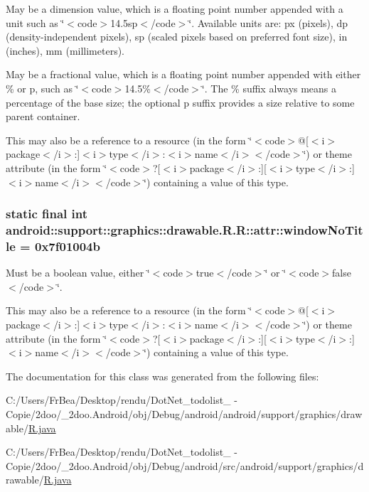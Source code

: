 May be a dimension value, which is a floating point number appended with a unit such as \char`\"{}$<$code$>$14.5sp$<$/code$>$\char`\"{}. Available units are: px (pixels), dp (density-independent pixels), sp (scaled pixels based on preferred font size), in (inches), mm (millimeters). 

May be a fractional value, which is a floating point number appended with either \% or p, such as \char`\"{}$<$code$>$14.5\%$<$/code$>$\char`\"{}. The \% suffix always means a percentage of the base size; the optional p suffix provides a size relative to some parent container. 

This may also be a reference to a resource (in the form \char`\"{}$<$code$>$@\mbox{[}$<$i$>$package$<$/i$>$:\mbox{]}$<$i$>$type$<$/i$>$:$<$i$>$name$<$/i$>$$<$/code$>$\char`\"{}) or theme attribute (in the form \char`\"{}$<$code$>$?\mbox{[}$<$i$>$package$<$/i$>$:\mbox{]}\mbox{[}$<$i$>$type$<$/i$>$:\mbox{]}$<$i$>$name$<$/i$>$$<$/code$>$\char`\"{}) containing a value of this type. \hypertarget{classandroid_1_1support_1_1graphics_1_1drawable_1_1_r_1_1attr_f3e6e8581d4810235eb570d06f22c239}{
\subsubsection[{windowNoTitle}]{\setlength{\rightskip}{0pt plus 5cm}static final int android::support::graphics::drawable.R.R::attr::windowNoTitle = 0x7f01004b}}
\label{classandroid_1_1support_1_1graphics_1_1drawable_1_1_r_1_1attr_f3e6e8581d4810235eb570d06f22c239}


Must be a boolean value, either \char`\"{}$<$code$>$true$<$/code$>$\char`\"{} or \char`\"{}$<$code$>$false$<$/code$>$\char`\"{}. 

This may also be a reference to a resource (in the form \char`\"{}$<$code$>$@\mbox{[}$<$i$>$package$<$/i$>$:\mbox{]}$<$i$>$type$<$/i$>$:$<$i$>$name$<$/i$>$$<$/code$>$\char`\"{}) or theme attribute (in the form \char`\"{}$<$code$>$?\mbox{[}$<$i$>$package$<$/i$>$:\mbox{]}\mbox{[}$<$i$>$type$<$/i$>$:\mbox{]}$<$i$>$name$<$/i$>$$<$/code$>$\char`\"{}) containing a value of this type. 

The documentation for this class was generated from the following files:\begin{CompactItemize}
\item 
C:/Users/FrBea/Desktop/rendu/DotNet\_\-todolist\_ - Copie/2doo/\_\-2doo.Android/obj/Debug/android/android/support/graphics/drawable/\hyperlink{android_2support_2graphics_2drawable_2_r_8java}{R.java}\item 
C:/Users/FrBea/Desktop/rendu/DotNet\_\-todolist\_ - Copie/2doo/\_\-2doo.Android/obj/Debug/android/src/android/support/graphics/drawable/\hyperlink{src_2android_2support_2graphics_2drawable_2_r_8java}{R.java}\end{CompactItemize}
